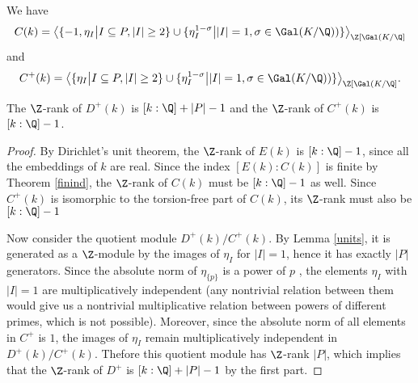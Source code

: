 \begin{cor}
We have $$C(k)=\big\langle \{ -1, \eta_I \big\vert I \subseteq P,  |I|\geq 2\} \cup \{\eta_I^{1-\sigma} \big\vert |I|=1, \sigma\in \Gal(K/\Q))\}\big\rangle_{\Z[\Gal(K/\Q]}$$
and
$$C^+(k)=\big\langle \{ \eta_I \big\vert I \subseteq P,  |I|\geq 2\} \cup \{\eta_I^{1-\sigma} \big\vert |I|=1, \sigma\in \Gal(K/\Q))\}\big\rangle_{\Z[\Gal(K/\Q]}.$$
\end{cor}


\begin{prop}\label{Drank}
The $\Z$-rank of $D^+(k)$ is $[k:\Q]+|P|-1$ and the $\Z$-rank of $C^+(k)$ is $[k:\Q]-1$.
\end{prop}
\begin{proof}
By Dirichlet's unit theorem, the $\Z$-rank of $E(k)$ is $[k:\Q]-1$, since all the embeddings of $k$ are real. Since the index $[E(k):C(k)]$ is finite by Theorem \ref{finind},  the $\Z$-rank of $C(k)$ must be $[k:\Q]-1$ as well. Since $C^+(k)$ is isomorphic to the torsion-free part of $C(k)$, its $\Z$-rank must also be $[k:\Q]-1$

Now consider the quotient module $D^+(k)/C^+(k)$. By Lemma \ref{units}, it is generated as a $\Z$-module by the images of $\eta_I$ for $|I|=1$, hence it has exactly $|P|$ generators. Since the absolute norm of $\eta_{\{p\}}$ is a power of $p$%
, the elements $\eta_I$ with $|I|=1$ are multiplicatively independent (any nontrivial relation between them would give us a nontrivial multiplicative relation between powers of different primes, which is not possible). Moreover, since the absolute norm of all elements in $C^+$ is $1$, the images of $\eta_I$ remain multiplicatively independent in $D^+(k)/C^+(k)$. Thefore this quotient module has $\Z$-rank $|P|$, which implies that the $\Z$-rank of $D^+$ is $[k:\Q]+|P|-1$ by the first part.
\end{proof}


